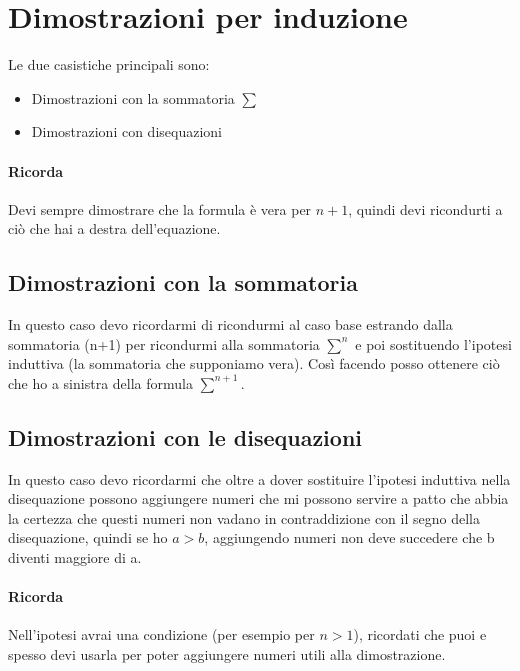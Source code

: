 \documentclass[12pt, a4paper, openany]{book}
\begin{document}
\section{Dimostrazioni per induzione}
Le due casistiche principali sono:
\begin{itemize}
	\item Dimostrazioni con la sommatoria $\sum$
	\item Dimostrazioni con disequazioni
\end{itemize}
\paragraph*{Ricorda} Devi sempre dimostrare che la formula è vera per $n+1$, quindi devi ricondurti a
ciò che hai a destra dell'equazione.

\subsection*{Dimostrazioni con la sommatoria}
In questo caso devo ricordarmi di ricondurmi al caso base estrando dalla sommatoria (n+1)
per ricondurmi alla sommatoria $\sum^n$ e poi sostituendo l'ipotesi induttiva
(la sommatoria che supponiamo vera). Così facendo posso ottenere ciò che ho a sinistra della
formula $\sum^{n+1}$.
\subsection*{Dimostrazioni con le disequazioni}
In questo caso devo ricordarmi che oltre a dover sostituire l'ipotesi induttiva nella disequazione
possono aggiungere numeri che mi possono servire a patto che abbia la certezza che questi numeri non
vadano in contraddizione con il segno della disequazione, quindi se ho $a>b$, aggiungendo numeri non deve succedere
che b diventi maggiore di a.
\paragraph*{Ricorda} Nell'ipotesi avrai una condizione (per esempio per $n>1$), ricordati che puoi e spesso
devi usarla per poter aggiungere numeri utili alla dimostrazione.
\end{document}

